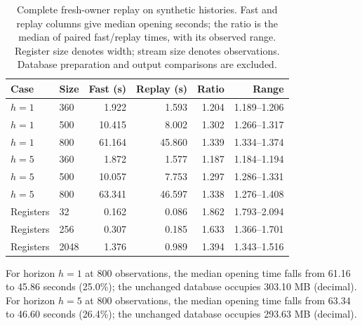 \begin{table}[H]\centering\small
\caption{Complete fresh-owner replay on synthetic histories. Fast and replay columns give median opening seconds; the ratio is the median of paired fast/replay times, with its observed range. Register size denotes width; stream size denotes observations. Database preparation and output comparisons are excluded.}\label{tab:replayopens}
\begin{tabular}{llrrrr}\toprule
Case & Size & Fast (s) & Replay (s) & Ratio & Range \\ \midrule
$h=1$ & 360 & 1.922 & 1.593 & 1.204 & 1.189--1.206 \\
$h=1$ & 500 & 10.415 & 8.002 & 1.302 & 1.266--1.317 \\
$h=1$ & 800 & 61.164 & 45.860 & 1.339 & 1.334--1.374 \\
$h=5$ & 360 & 1.872 & 1.577 & 1.187 & 1.184--1.194 \\
$h=5$ & 500 & 10.057 & 7.753 & 1.297 & 1.286--1.331 \\
$h=5$ & 800 & 63.341 & 46.597 & 1.338 & 1.276--1.408 \\
Registers & 32 & 0.162 & 0.086 & 1.862 & 1.793--2.094 \\
Registers & 256 & 0.307 & 0.185 & 1.633 & 1.366--1.701 \\
Registers & 2048 & 1.376 & 0.989 & 1.394 & 1.343--1.516 \\
\bottomrule\end{tabular}\end{table}
For horizon $h=1$ at 800 observations, the median opening time falls from 61.16 to 45.86 seconds (25.0\%); the unchanged database occupies 303.10 MB (decimal).
For horizon $h=5$ at 800 observations, the median opening time falls from 63.34 to 46.60 seconds (26.4\%); the unchanged database occupies 293.63 MB (decimal).
